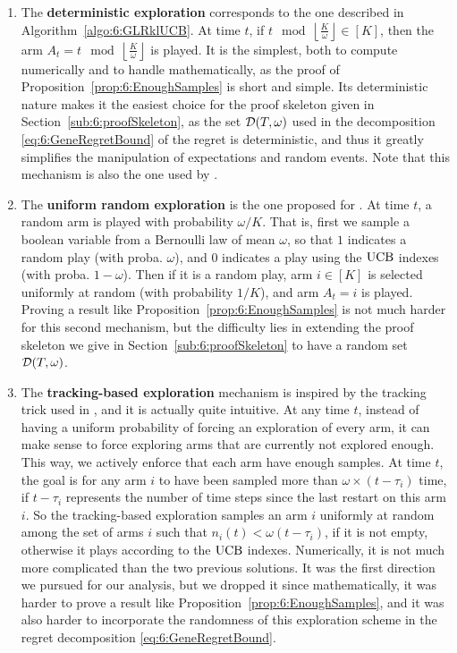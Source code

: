 \begin{enumerate}%
    \item
    The \textbf{deterministic exploration}
    corresponds to the one described in Algorithm~\ref{algo:6:GLRklUCB}.
    At time $t$, if $t \mod \left\lfloor \frac{K}{\omega}\right\rfloor \in [K]$, then the arm $A_t = t \mod \left\lfloor \frac{K}{\omega}\right\rfloor$ is played.
    It is the simplest, both to compute numerically and to handle mathematically, as the proof of Proposition~\ref{prop:6:EnoughSamples} is short and simple.
    Its deterministic nature makes it the easiest choice for the proof skeleton given in Section~\ref{sub:6:proofSkeleton}, as the set $\mathcal{D}(T,\omega)$ used in the decomposition \eqref{eq:6:GeneRegretBound} of the regret is deterministic, and thus it greatly simplifies the manipulation of expectations and random events.
    Note that this mechanism is also the one used by \MUCB{} \cite{CaoZhenKvetonXie18}.

    \item
    The \textbf{uniform random exploration} is the one proposed for \CUSUMUCB{} \cite{LiuLeeShroff17}.
    At time $t$, a random arm is played with probability $\omega/K$. That is, first we sample a boolean variable from a Bernoulli law of mean $\omega$, so that $1$ indicates a random play (with proba. $\omega$), and $0$ indicates a play using the $\mathrm{UCB}$ indexes (with proba. $1-\omega$). Then if it is a random play, arm $i\in[K]$ is selected uniformly at random (with probability $1/K$), and arm $A_t = i$ is played.
    Proving a result like Proposition~\ref{prop:6:EnoughSamples} is not much harder for this second mechanism,
    but the difficulty lies in extending the proof skeleton we give in Section~\ref{sub:6:proofSkeleton} to have a random set $\mathcal{D}(T,\omega)$.

    \item
    The \textbf{tracking-based exploration} mechanism is inspired by the tracking trick used in \cite{Garivier16BAI}, and it is actually quite intuitive.
    At any time $t$, instead of having a uniform probability of forcing an exploration of every arm, it can make sense to force exploring arms that are currently not explored enough. This way, we actively enforce that each arm have enough samples.
    At time $t$, the goal is for any arm $i$ to have been sampled more than $\omega \times (t - \tau_i)$ time, if $t - \tau_i$ represents the number of time steps since the last restart on this arm $i$.
    So the tracking-based exploration samples an arm $i$ uniformly at random among the set of arms $i$ such that $n_i(t) < \omega (t - \tau_i)$, if it is not empty, otherwise it plays according to the $\mathrm{UCB}$ indexes.
    Numerically, it is not much more complicated than the two previous solutions.
    It was the first direction we pursued for our analysis, but we dropped it since mathematically, it was harder to prove a result like Proposition~\ref{prop:6:EnoughSamples}, and it was also harder to incorporate the randomness of this exploration scheme in the regret decomposition \eqref{eq:6:GeneRegretBound}.
\end{enumerate}

